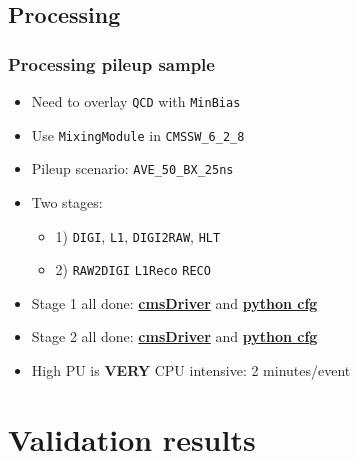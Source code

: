 \documentclass[bigger]{beamer}
\providecommand{\alert}[1]{\textbf{#1}}
\begin{document}
\subsection{Processing}
\label{sec-2-3}
\begin{frame}
\frametitle{Processing pileup sample}
\label{sec-2-3-1}
\begin{itemize}

\item Need to overlay \texttt{QCD} with \texttt{MinBias}
\label{sec-2-3-1-1}%

\item Use \texttt{MixingModule} in \texttt{CMSSW\_6\_2\_8}
\label{sec-2-3-1-2}%

\item Pileup scenario: \texttt{AVE\_50\_BX\_25ns}
\label{sec-2-3-1-3}%

\item Two stages:
\label{sec-2-3-1-4}%
\begin{itemize}

\item 1) \texttt{DIGI}, \texttt{L1}, \texttt{DIGI2RAW}, \texttt{HLT}
\label{sec-2-3-1-4-1}%

\item 2) \texttt{RAW2DIGI} \texttt{L1Reco} \texttt{RECO}
\label{sec-2-3-1-4-2}%
\end{itemize} %

\item Stage 1 all done: \href{https://github.com/edmundaberry/HcalReco/blob/master/test/hcalNoise_fromGEN-SIM_toGEN-SIM-RAW_62X_withMixer_cmsDriver.sh}{\alert{cmsDriver}} and \href{https://github.com/edmundaberry/HcalReco/blob/master/test/hcalNoise_fromGEN-SIM_toGEN-SIM-RAW_62X_withMixer_cfg.py}{\alert{python cfg}}
\label{sec-2-3-1-5}%

\item Stage 2 all done: \href{https://github.com/edmundaberry/HcalReco/blob/master/test/hcalNoise_fromGEN-SIM-RAW_62X_cmsDriver.sh}{\alert{cmsDriver}} and \href{https://github.com/edmundaberry/HcalReco/blob/master/test/hcalNoise_fromGEN-SIM-RAW_62X_cfg.py}{\alert{python cfg}}
\label{sec-2-3-1-6}%

\item High PU is \alert{VERY} CPU intensive: 2 minutes/event
\label{sec-2-3-1-7}%
\end{itemize} %
\end{frame}
\section{Validation results}
\label{sec-3}
\end{document}
